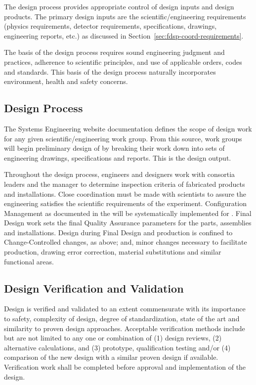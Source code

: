 The  design process provides appropriate control of design
inputs and design products. The primary design inputs are the
 scientific/engineering requirements (physics
requirements, detector requirements, specifications, drawings,
engineering reports, etc.) as discussed in
Section~\ref{sec:fdsp-coord-requirements}.

The basis of the design process requires sound engineering judgment
and practices, adherence to scientific principles, and use of
applicable orders, codes and standards. This basis of the design
process naturally incorporates environment, health and safety
concerns.

\subsection{Design Process}

The  Systems Engineering website
documentation defines the scope of design work for any given
scientific/engineering work group. From this source, work groups
will begin preliminary design of  by breaking their work
down into sets of engineering drawings, specifications and
reports. This is the design output.

Throughout the design process, engineers and designers work with
consortia leaders and the   manager to
determine  inspection criteria of fabricated products and
installations. Close coordination must be made with 
scientists to assure the engineering satisfies the scientific
requirements of the experiment. Configuration Management as documented
in the   will be
systematically implemented for . Final Design work sets
the final Quality Assurance parameters for the parts, assemblies and
installations. Design during Final Design and production is confined
to Change-Controlled changes, as above; and, minor changes necessary
to facilitate production, drawing error correction, material
substitutions and similar functional areas.

\subsection{Design Verification and Validation}
\label{sec:verification}

Design is verified and validated to an extent commensurate with its
importance to safety, complexity of design, degree of standardization,
state of the art and similarity to proven design
approaches. Acceptable verification methods include but are not
limited to any one or combination of (1) design reviews, (2)
alternative calculations, and (3) prototype, qualification testing
and/or (4) comparison of the new design with a similar proven design
if available. Verification work shall be completed before approval and
implementation of the design.

